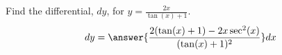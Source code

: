 \documentclass{ximera}
\author{Gregory Hartman \and Matthew Carr}
\begin{document}
\begin{exercise}




Find the differential, $dy$, for $y=\frac{2x}{\tan(x)+1}$.
\[
dy=\answer{\frac{2(\tan(x)+ 1)-2x\sec^2(x)}{(\tan(x)+1)^2}}dx
\]

\end{exercise}
\end{document}
